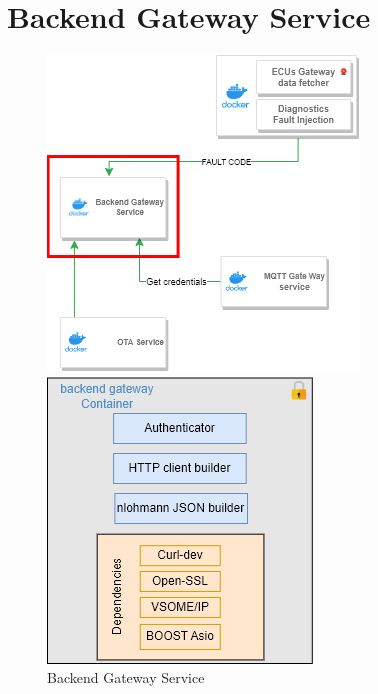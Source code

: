 \documentclass[
12pt,
oneside, 
onehalfspacing, 
nolistspacing, 
parskip, 
chapterinoneline, 
]{AASTCOMPUTER}
\begin{document}
\section{Backend Gateway Service}
\begin{figure}[!ht]
\centering
\begin{minipage}{0.45\textwidth}
  \centering
  \includegraphics[width=\linewidth]{Figures/24.png}
  \caption[Backend Gateway Service]{Backend Gateway Service}
  \label{fig:Backend Gateway Service}
\end{minipage}\hfill
\begin{minipage}{0.45\textwidth}
  \centering
  \includegraphics[width=\linewidth]{Figures/25.png}

\end{minipage}
\end{figure}
\end{document}
